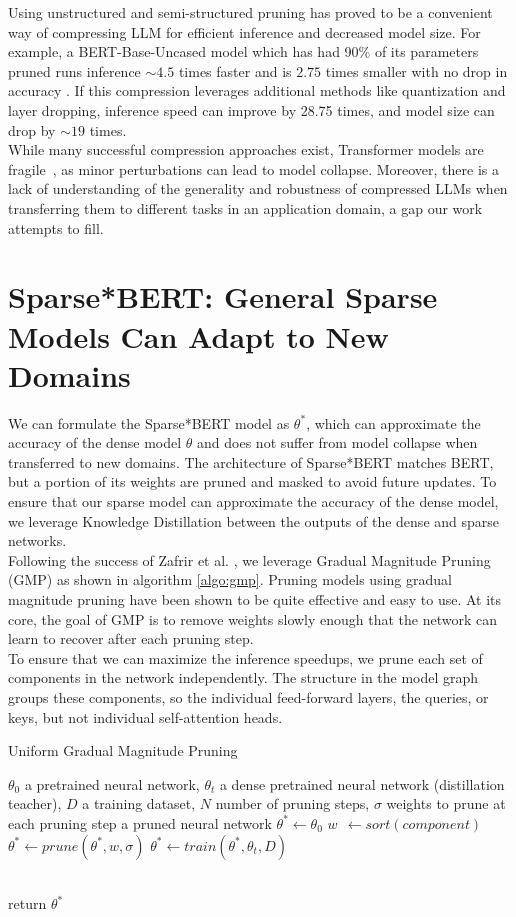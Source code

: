 Using unstructured and semi-structured pruning has proved to be a convenient way of compressing LLM for efficient inference and decreased model size. For example, a BERT-Base-Uncased model which has had 90\% of its parameters pruned runs inference $\sim\!4.5$ times faster and is $2.75$ times smaller with no drop in accuracy \cite{Kurti2022TheOB}. If this compression leverages additional methods like quantization and layer dropping, inference speed can improve by 28.75 times, and model size can drop by $\sim\!19$ times. \\
While many successful compression approaches exist, Transformer models are fragile~\cite{DBLP:journals/corr/abs-2105-06990}, as minor perturbations can lead to model collapse. Moreover, there is a lack of understanding of the generality and robustness of compressed LLMs when transferring them to different tasks in an application domain, a gap our work attempts to fill. 
\section{Sparse*BERT: General Sparse Models Can Adapt to New Domains}
We can formulate the Sparse*BERT model as $\theta^*$, which can approximate the accuracy of the dense model $\theta$ and does not suffer from model collapse when transferred to new domains. The architecture of Sparse*BERT matches BERT, but a portion of its weights are pruned and masked to avoid future updates. To ensure that our sparse model can approximate the accuracy of the dense model, we leverage Knowledge Distillation between the outputs of the dense and sparse networks.   \\
Following the success of Zafrir et al. \cite{Zafrir2021PruneOF}, we leverage Gradual Magnitude Pruning (GMP) as shown in algorithm \ref{algo:gmp}. Pruning models using gradual magnitude pruning have been shown to be quite effective and easy to use. At its core, the goal of GMP is to remove weights slowly enough that the network can learn to recover after each pruning step.  \\
To ensure that we can maximize the inference speedups, we prune each set of components in the network independently. The structure in the model graph groups these components, so the individual feed-forward layers, the queries, or keys, but not individual self-attention heads.
\begin{algorithm}
\caption{Uniform Gradual Magnitude Pruning}
\label{algo:gmp}
\begin{algorithmic}
{\small
\Require $\theta_0$ a pretrained neural network, $\theta_t$ a dense pretrained neural network (distillation teacher), $D$ a training dataset, $N$ number of pruning steps, $\sigma$ weights to prune at each pruning step
\Ensure a pruned neural network
    \State $ \theta^*  \gets \theta_0$
        \State $w\phantom{,} \gets sort(component)$
        \State $\theta^* \gets prune(\theta^*, w, \sigma)$ 
    \EndFor
    \State $\theta^* \gets train(\theta^*,\theta_t,D)$
    
\EndFor \\
return $\theta^*$
}
\end{algorithmic}
\end{algorithm}
